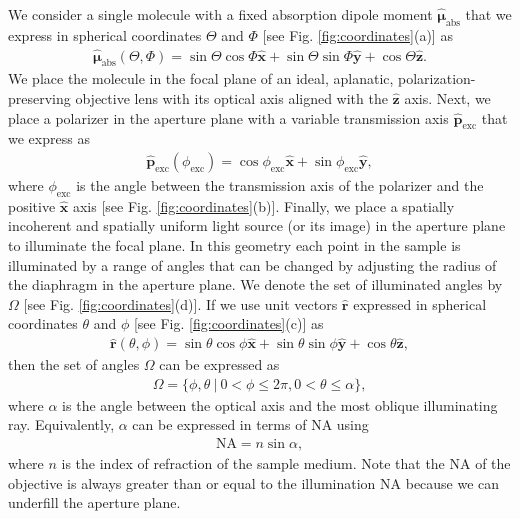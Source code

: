\documentclass[10pt]{article}
\providecommand{\mb}[1]{\mathbf{#1}}
\providecommand{\mh}[1]{\mathbf{\hat{#1}}}
\providecommand{\bs}[1]{\boldsymbol{#1}}
\begin{document}
We consider a single molecule with a fixed absorption dipole moment
$\hat{\bs{\mu}}_{\text{abs}}$ that we express in spherical coordinates $\Theta$
and $\Phi$ {\color{urlblue}[}see {\color{urlblue}Fig.} \ref{fig:coordinates}{\color{urlblue}(a)}{\color{urlblue}]} as
\begin{align}
  \hat{\bs{\mu}}_{\text{abs}}(\Theta, \Phi) = \sin\Theta\cos\Phi\hat{\mb{x}} + \sin\Theta\sin\Phi\hat{\mb{y}} + \cos\Theta\hat{\mb{z}} \label{eq:mu}.
\end{align}
We place the molecule in the focal plane of an ideal, aplanatic,
polarization-preserving objective lens with its optical axis aligned with the
$\mh{z}$ axis. Next, we place a polarizer in the aperture plane with a variable
transmission axis $\hat{\mb{p}}_{\text{exc}}$ that we express as
\begin{align}
 \hat{\mb{p}}_{\text{exc}}(\phi_{\text{exc}}) = \cos\phi_{\text{exc}}\hat{\mb{x}} +
\sin\phi_{\text{exc}}\hat{\mb{y}},\label{eq:excfield}
\end{align}
where $\phi_{\text{exc}}$ is the angle between the transmission axis of the
polarizer and the positive $\mh{x}$ axis {\color{urlblue}[}see {\color{urlblue}Fig.}
\ref{fig:coordinates}{\color{urlblue}(b)}{\color{urlblue}]}. Finally, we place a spatially incoherent and spatially
uniform light source (or its image) in the aperture plane to illuminate the
focal plane. In this geometry each point in the sample is illuminated by a range
of angles that can be changed by adjusting the radius of the diaphragm in the
aperture plane. We denote the set of illuminated angles by $\Omega$ {\color{urlblue}[}see {\color{urlblue}Fig.}
\ref{fig:coordinates}{\color{urlblue}(d)}{\color{urlblue}]}. If we use unit vectors $\hat{\mb{r}}$ expressed in
spherical coordinates $\theta$ and $\phi$ {\color{urlblue}[}see {\color{urlblue}Fig.} \ref{fig:coordinates}{\color{urlblue}(c)}{\color{urlblue}]}
as
  \begin{align}
   \hat{\mb{r}}(\theta, \phi) = \sin\theta\cos\phi\hat{\mb{x}} + \sin\theta\sin\phi\hat{\mb{y}} + \cos\theta\hat{\mb{z}}, 
  \end{align}
  then the set of angles $\Omega$ can be expressed as
  \begin{align}
  \Omega = \{\phi, \theta\ |\ 0 < \phi \leq 2\pi, 0 < \theta \leq \alpha\},
  \end{align}
  where $\alpha$ is the angle between the optical axis and the most oblique
  illuminating ray. Equivalently, $\alpha$ can be expressed in terms of NA using
  \begin{align}
    \text{NA} = n\sin\alpha, 
  \end{align}
  where $n$ is the index of refraction of the sample medium. Note that the NA of
  the objective is always greater than or equal to the illumination NA because
  we can underfill the aperture plane.
  
\end{document}
